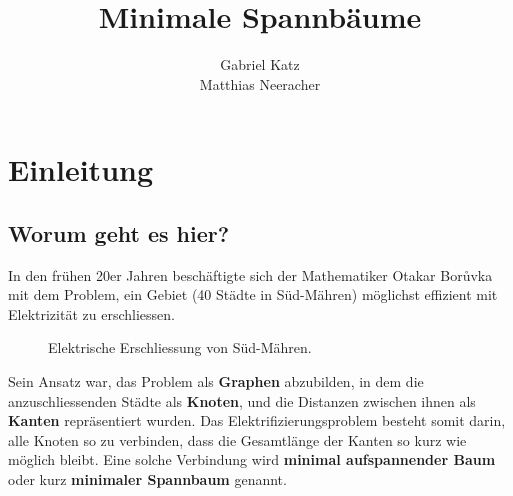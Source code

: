 \documentclass[12pt,a4paper]{report}
\title{Minimale Spannb\"{a}ume}
\author{Gabriel Katz\\ Matthias Neeracher}
\theoremstyle{break}
\theoremstyle{plain}
\begin{document}
\maketitle
\tableofcontents
\chapter{Einleitung}

\section{Worum geht es hier?}

In den fr\"uhen 20er Jahren besch\"aftigte sich der 
Mathematiker Otakar Bor\r{u}vka mit dem Problem, ein Gebiet (40
St\"{a}dte in S\"{u}d-M\"{a}hren) m\"{o}glichst effizient mit 
Elektrizit\"{a}t zu erschliessen.

\begin{figure}[h!]
\caption{Elektrische Erschliessung von S\"{u}d-M\"{a}hren.\protect\footnotemark}
\end{figure}

Sein Ansatz war, das Problem als \textbf{Graphen} abzubilden, in dem die
anzuschliessenden St\"{a}dte als \textbf{Knoten}, und die Distanzen zwischen ihnen
als \textbf{Kanten} repr\"{a}sentiert wurden. Das Elektrifizierungsproblem
besteht somit darin, alle Knoten so zu verbinden, dass die
Gesamtl\"{a}nge der Kanten so kurz wie m\"{o}glich bleibt. Eine solche
Verbindung wird \textbf{minimal aufspannender Baum} oder kurz
\textbf{minimaler Spannbaum} genannt.
\end{document}
